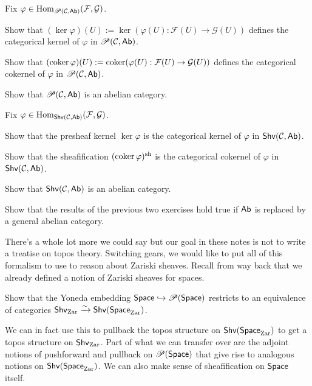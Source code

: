 \documentclass[11pt]{article}
\newcommand{\CC}{\mathcal{C}}
\renewcommand{\F}{\mathcal{F}}
\newcommand{\G}{\mathcal{G}}
\renewcommand{\phi}{\varphi}
\begin{document}
\begin{exercise}
Fix $\phi\in\Hom_{\Pre(\CC,\Ab)}(\F,\G)$.
\begin{enum}{\alph}
\item Show that $(\ker\phi)(U):=\ker(\phi(U): \F(U)\to\G(U))$ defines the categorical kernel of $\phi$ in $\Pre(\CC,\Ab)$.

\item Show that $(\coker\phi)(U):=\coker(\phi(U): \F(U)\to\G(U))$ defines the categorical cokernel of $\phi$ in $\Pre(\CC,\Ab)$.

\item Show that $\Pre(\CC,\Ab)$ is an abelian category.
\end{enum}
\end{exercise}

\begin{exercise}
Fix $\phi\in\Hom_{\Shv(\CC,\Ab)}(\F,\G)$.
\begin{enum}{\alph}
\item Show that the presheaf kernel $\ker\phi$ is the categorical kernel of $\phi$ in $\Shv(\CC,\Ab)$.

\item Show that the sheafification $(\coker\phi)^{\sh}$ is the categorical cokernel of $\phi$ in $\Shv(\CC,\Ab)$.

\item Show that $\Shv(\CC,\Ab)$ is an abelian category.
\end{enum}
\end{exercise}

\begin{exercise}
Show that the results of the previous two exercises hold true if $\operatorname{\mathsf{Ab}}$ is replaced by a general abelian category.
\end{exercise}

There's a whole lot more we could say but our goal in these notes is not to write a treatise on topos theory. Switching gears, we would like to put all of this formalism to use to reason about Zariski sheaves. Recall from way back that we already defined a notion of Zariski sheaves for spaces. 

\begin{exercise}
Show that the Yoneda embedding $\operatorname{\mathsf{Space}}\hookrightarrow\operatorname{\mathscr{P}}(\operatorname{\mathsf{Space}})$ restricts to an equivalence of categories $\operatorname{\mathsf{Shv}}_{\operatorname{Zar}}\xrightarrow{\sim}\operatorname{\mathsf{Shv}}(\operatorname{\mathsf{Space}}_{\operatorname{Zar}})$.
\end{exercise}

We can in fact use this to pullback the topos structure on $\operatorname{\mathsf{Shv}}(\operatorname{\mathsf{Space}}_{\operatorname{Zar}})$ to get a topos structure on $\operatorname{\mathsf{Shv}}_{\operatorname{Zar}}$. Part of what we can transfer over are the adjoint notions of pushforward and pullback on $\operatorname{\mathscr{P}}(\operatorname{\mathsf{Space}})$ that give rise to analogous notions on $\operatorname{\mathsf{Shv}}(\operatorname{\mathsf{Space}}_{\operatorname{Zar}})$. We can also make sense of sheafification on $\operatorname{\mathsf{Space}}$ itself.
\end{document}
